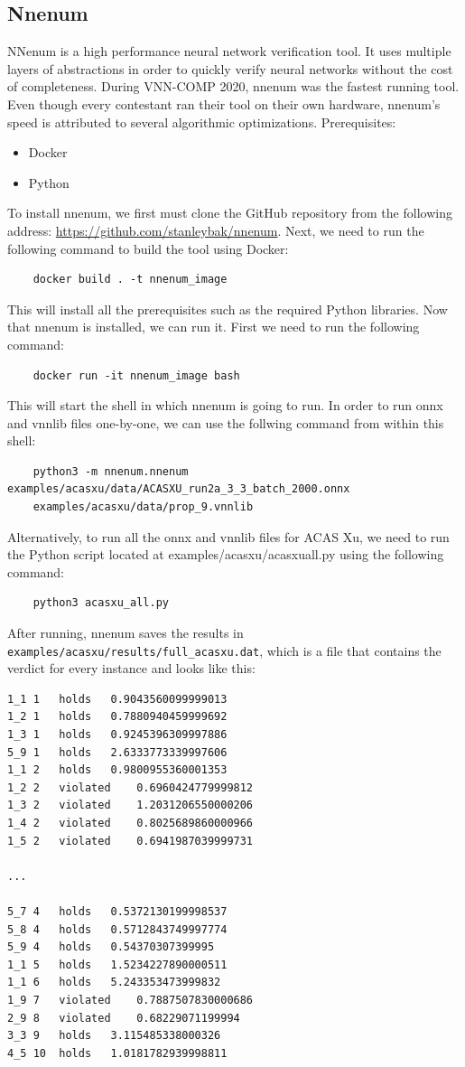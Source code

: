 \documentclass{article}
\begin{document}
\subsection{Nnenum}
NNenum\cite{nnenum} is a high performance neural network verification tool. It uses multiple layers of abstractions in order to quickly verify neural networks without the cost of completeness. During VNN-COMP 2020, nnenum was the fastest running tool. Even though every contestant ran their tool on their own hardware, nnenum's speed is attributed to several algorithmic optimizations\cite{bak2021nfm}.
\newline
Prerequisites: 
\begin{itemize}
    \item Docker
    \item Python
\end{itemize}
To install nnenum, we first must clone the GitHub repository from the following address:  \url{https://github.com/stanleybak/nnenum}.
Next, we need to run the following command to build the tool using Docker:
\begin{verbatim}
    docker build . -t nnenum_image
\end{verbatim}
This will install all the prerequisites such as the required Python libraries.
\newline
Now that nnenum is installed, we can run it. First we need to run the following command:
\begin{verbatim}
    docker run -it nnenum_image bash
\end{verbatim}
This will start the shell in which nnenum is going to run.
\newline
In order to run onnx and vnnlib files one-by-one, we can use the follwing command from within this shell:
\begin{verbatim}
    python3 -m nnenum.nnenum examples/acasxu/data/ACASXU_run2a_3_3_batch_2000.onnx
    examples/acasxu/data/prop_9.vnnlib
\end{verbatim}
Alternatively, to run all the onnx and vnnlib files for ACAS Xu, we need to run the Python script located at examples/acasxu/acasxu\textunderscore all.py using the following command:
\begin{verbatim}
    python3 acasxu_all.py
\end{verbatim}
After running, nnenum saves the results in \verb|examples/acasxu/results/full_acasxu.dat|, which is a file that contains the verdict for every instance and looks like this:
\begin{verbatim}
1_1	1	holds	0.9043560099999013
1_2	1	holds	0.7880940459999692
1_3	1	holds	0.9245396309997886
5_9	1	holds	2.6333773339997606
1_1	2	holds	0.9800955360001353
1_2	2	violated	0.6960424779999812
1_3	2	violated	1.2031206550000206
1_4	2	violated	0.8025689860000966
1_5	2	violated	0.6941987039999731

...

5_7	4	holds	0.5372130199998537
5_8	4	holds	0.5712843749997774
5_9	4	holds	0.54370307399995
1_1	5	holds	1.5234227890000511
1_1	6	holds	5.243353473999832
1_9	7	violated	0.7887507830000686
2_9	8	violated	0.68229071199994
3_3	9	holds	3.115485338000326
4_5	10	holds	1.0181782939998811
\end{verbatim}
\end{document}
